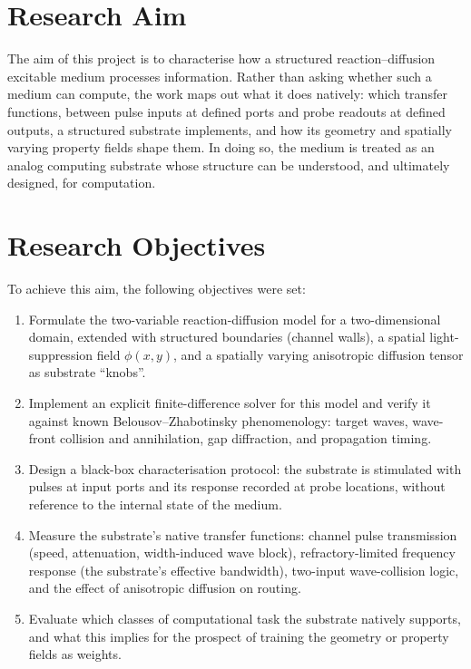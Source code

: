 \section{Research Aim}
\label{sec:aim}

The aim of this project is to characterise how a structured reaction--diffusion excitable medium processes information.
Rather than asking whether such a medium can compute, the work maps out what it does natively: which transfer functions, between pulse inputs at defined ports and probe readouts at defined outputs, a structured substrate implements, and how its geometry and spatially varying property fields shape them.
In doing so, the medium is treated as an analog computing substrate whose structure can be understood, and ultimately designed, for computation.

\section{Research Objectives}
\label{sec:objectives}

To achieve this aim, the following objectives were set:

\begin{enumerate}
    \item Formulate the two-variable reaction-diffusion model for a two-dimensional domain, extended with structured boundaries (channel walls), a spatial light-suppression field $\phi(x,y)$, and a spatially varying anisotropic diffusion tensor as substrate ``knobs''.
    \item Implement an explicit finite-difference solver for this model and verify it against known Belousov--Zhabotinsky phenomenology: target waves, wave-front collision and annihilation, gap diffraction, and propagation timing.
    \item Design a black-box characterisation protocol: the substrate is stimulated with pulses at input ports and its response recorded at probe locations, without reference to the internal state of the medium.
    \item Measure the substrate's native transfer functions: channel pulse transmission (speed, attenuation, width-induced wave block), refractory-limited frequency response (the substrate's effective bandwidth), two-input wave-collision logic, and the effect of anisotropic diffusion on routing.
    \item Evaluate which classes of computational task the substrate natively supports, and what this implies for the prospect of training the geometry or property fields as weights.
\end{enumerate}

